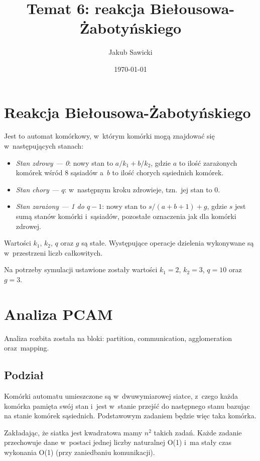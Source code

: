 \documentclass[a4paper; 12pt]{article}
\title{Temat 6: reakcja Biełousowa-Żabotyńskiego}
\author{Jakub Sawicki}
\date{\today}
\begin{document}
\renewcommand{\figurename}{Rys.}
\renewcommand{\tablename}{Tab.}
\renewcommand{\abstractname}{Abstrakt}

\maketitle

\section{Reakcja Biełousowa-Żabotyńskiego}

Jest to automat komórkowy, w~którym komórki mogą znajdować się w~następujących stanach:
\begin{itemize}
    \item \emph{Stan zdrowy --- 0}: nowy stan to $a/k_1+b/k_2$, gdzie $a$ to
        ilość zarażonych komórek wśród 8 sąsiadów a~$b$ to ilość chorych
        sąsiednich komórek.
    \item \emph{Stan chory --- $q$}: w~następnym kroku zdrowieje, tzn.~jej stan to 0.
    \item \emph{Stan zarażony --- 1 do $q-1$}: nowy stan to
        $s/(a+b+1)+g$, gdzie $s$ jest sumą stanów komórki i~sąsiadów, pozostałe
        oznaczenia jak dla komórki zdrowej.
\end{itemize}
Wartości $k_1$, $k_2$, $q$ oraz $g$ są stałe.
Występujące operacje dzielenia wykonywane są w~przestrzeni liczb całkowitych.

Na potrzeby symulacji ustawione zostały wartości $k_1 = 2$, $k_2 = 3$, $q = 10$
oraz $g = 3$.~\cite{hermetic}

\section{Analiza PCAM}

Analiza rozbita została na bloki: partition, communication, agglomeration oraz~mapping.~\cite{foster}

\subsection{Podział}
Komórki automatu umieszczone są w~dwuwymiarowej siatce, z~czego każda
komórka pamięta swój stan i~jest w~stanie przejść do następnego stanu bazując
na stanie komórek sąsiednich.
Podstawowym zadaniem będzie więc taka komórka.

Zakładając, że siatka jest kwadratowa mamy $n^2$ takich zadań. 
Każde zadanie przechowuje dane w~postaci jednej liczby naturalnej O(1) i~ma
stały czas wykonania O(1) (przy zaniedbaniu komunikacji).
\end{document}
